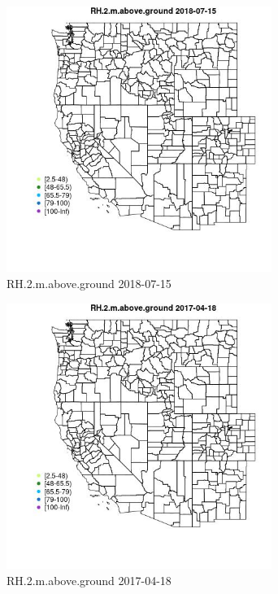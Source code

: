 \begin{figure} 
\centering  
\includegraphics[width=0.77\textwidth]{Code_Outputs/Report_ML_input_PM25_Step4_part_e_de_duplicated_aveswNAs_MapObsRH2maboveground2018-07-15.jpg} 
\caption{\label{fig:Report_ML_input_PM25_Step4_part_e_de_duplicated_aveswNAsMapObsRH2maboveground2018-07-15}RH.2.m.above.ground 2018-07-15} 
\end{figure} 
 

\begin{figure} 
\centering  
\includegraphics[width=0.77\textwidth]{Code_Outputs/Report_ML_input_PM25_Step4_part_e_de_duplicated_aveswNAs_MapObsRH2maboveground2017-04-18.jpg} 
\caption{\label{fig:Report_ML_input_PM25_Step4_part_e_de_duplicated_aveswNAsMapObsRH2maboveground2017-04-18}RH.2.m.above.ground 2017-04-18} 
\end{figure} 
 

